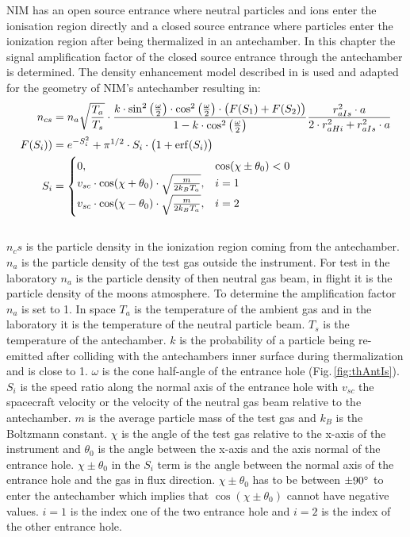 		
		NIM has an open source entrance where neutral particles and ions enter the ionisation region directly and a closed source entrance where particles enter the ionization region after being thermalized in an antechamber. In this chapter the signal amplification factor of the closed source entrance through the antechamber is determined. The density enhancement model described in \cite{DensEnhan_Wurz_07} is used and adapted for the geometry of NIM's antechamber resulting in:
		\begin{align}
			\label{eq:thDensEnhanNcs}
			n_{cs} &= n_a\sqrt{\frac{T_a}{T_s}}\cdot\frac{k\cdot \sin^2\big(\frac{\omega}{2}\big)\cdot \cos^2\big(\frac{\omega}{2}\big)\cdot \big(F(S_1)+ F(S_2)\big)}{1-k\cdot \cos^2\big(\frac{\omega}{2}\big)}\frac{r_{aIs}^2\cdot a}{2\cdot r_{aHi}^2 + r_{aIs}^2\cdot a}\\
			F(S_i)) &= e^{-S_i^2} + \pi^{1/2}\cdot S_i\cdot\big(1 + {\rm erf}(S_i)\big)\\
			S_i &= 
			\begin{cases}
				0, & \cos(\chi \pm \theta_0) < 0\\
				v_{sc}\cdot \cos(\chi + \theta_0)\cdot \sqrt{\frac{m}{2k_B T_a}}, & i=1\\
				v_{sc}\cdot \cos(\chi - \theta_0)\cdot \sqrt{\frac{m}{2k_B T_a}}, & i=2
			\end{cases}
		\end{align}
		\\
		$n_cs$ is the particle density in the ionization region coming from the antechamber. $n_a$ is the particle density of the test gas outside the instrument. For test in the laboratory $n_a$ is the particle density of then neutral gas beam, in flight it is the particle density of the moons atmosphere. To determine the amplification factor $n_a$ is set to 1. In space $T_a$ is the temperature of the ambient gas and in the laboratory it is the temperature of the neutral particle beam. $T_s$ is the temperature of the antechamber. $k$ is the probability of a particle being re-emitted after colliding with the antechambers inner surface during thermalization and is close to 1. $\omega$ is the cone half-angle of the entrance hole (Fig.\,\ref{fig:thAntIs}). $S_i$ is the speed ratio along the normal axis of the entrance hole with $v_{sc}$ the spacecraft velocity or the velocity of the neutral gas beam relative to the antechamber. $m$ is the average particle mass of the test gas and $k_B$ is the Boltzmann constant. $\chi$ is the angle of the test gas relative to the x-axis of the instrument and $\theta_0$ is the angle between the x-axis and the axis normal of the entrance hole. $\chi \pm \theta_0$ in the $S_i$ term is the angle between the normal axis of the entrance hole and the gas in flux direction. $\chi \pm \theta_0$ has to be between $\pm 90^\circ$ to enter the antechamber which implies that $\cos(\chi \pm \theta_0)$ cannot have negative values. $i=1$ is the index one of the two entrance hole and $i=2$ is the index of the other entrance hole.\\ 
